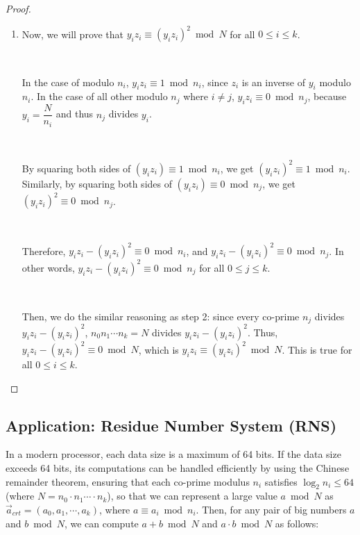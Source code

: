 \begin{proof}
\begin{enumerate}
$ $

\item Now, we will prove that $y_iz_i \equiv (y_iz_i)^2 \bmod N$  \text{ } for all $0 \leq i \leq k$. 

$ $

In the case of modulo $n_i$, $y_iz_i \equiv 1 \bmod n_i$, since $z_i$ is an inverse of $y_i$ modulo $n_i$. In the case of all other modulo $n_j$ where $i \neq j$, $y_iz_i \equiv 0 \bmod n_j$, because $y_i = \dfrac{N}{n_i}$ and thus $n_j$ divides $y_i$. 

$ $

By squaring both sides of $(y_iz_i) \equiv 1 \bmod n_i$, we get $(y_iz_i)^2 \equiv 1 \bmod n_i$. Similarly, by squaring both sides of $(y_iz_i) \equiv 0 \bmod n_j$, we get $(y_iz_i)^2 \equiv 0 \bmod n_j$.

$ $

Therefore, $y_iz_i - (y_iz_i)^2 \equiv 0 \bmod n_i$, and $y_iz_i - (y_iz_i)^2 \equiv 0 \bmod n_j$. In other words, $y_iz_i - (y_iz_i)^2 \equiv 0 \bmod n_j$ for all $0 \leq j \leq k$. 

$ $

Then, we do the similar reasoning as step 2: since every co-prime $n_j$ divides $y_iz_i - (y_iz_i)^2$, $n_0n_1\cdots n_k = N$ divides $y_iz_i - (y_iz_i)^2$. Thus, $y_iz_i - (y_iz_i)^2 \equiv 0 \bmod N$, which is $y_iz_i \equiv (y_iz_i)^2 \bmod N$. This is true for all $0 \leq i \leq k$. 

\end{enumerate}

\end{proof}


\subsection{Application: Residue Number System (RNS)} 
\label{subsec:crt-application}

In a modern processor, each data size is a maximum of 64 bits. If the data size exceeds 64 bits, its computations can be handled efficiently by using the Chinese remainder theorem, ensuring that each co-prime modulus $n_i$ satisfies $\log_2n_i \leq 64$ (where $N = n_0\cdot n_1\cdots\cdot n_k$), so that we can represent a large value $a \bmod N$ as $\vec{a}_{\mathit{crt}} = (a_0, a_1, \cdots , a_k)$, where $a \equiv a_i \bmod n_i$. Then, for any pair of big numbers $a$ and $b \bmod N$, we can compute $a + b \bmod N$ and $a \cdot b \bmod N$ as follows: 

